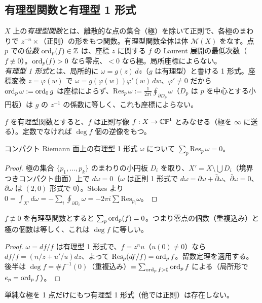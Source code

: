 \subsection{有理型関数と有理型 1 形式}
\begin{defn}
$X$ 上の\emph{有理型関数}とは、離散的な点の集合（極）を除いて正則で、各極のまわりで $z^{-n}\times$（正則）の形をもつ関数。有理型関数全体は体 $\mathcal M(X)$ をなす。点 $p$ での\emph{位数} $\operatorname{ord}_p(f)\in\mathbb Z$ は、座標 $z$ に関する $f$ の Laurent 展開の最低次数（$f\not\equiv0$）。$\operatorname{ord}_p(f)>0$ なら零点、$<0$ なら極。局所座標によらない。\\
\emph{有理型 1 形式}とは、局所的に $\omega=g(z)\,dz$（$g$ は有理型）と書ける 1 形式。座標変換 $z=\varphi(w)$ で $\omega=g(\varphi(w))\varphi'(w)\,dw$、$\varphi'\ne0$ だから $\operatorname{ord}_p\omega:=\operatorname{ord}_0g$ は座標によらず、$\mathrm{Res}_p\,\omega:=\frac1{2\pi i}\oint_{\partial D_p}\omega$（$D_p$ は $p$ を中心とする小円板）は $g$ の $z^{-1}$ の係数に等しく、これも座標によらない。
\end{defn}
$f$ を有理型関数とすると、$f$ は正則写像 $f:X\to\mathbb{CP}^1$ とみなせる（極を $\infty$ に送る）。定数でなければ $\deg f$ 個の逆像をもつ。
\begin{thm}[留数定理]\label{thm:residue}
コンパクト Riemann 面上の有理型 1 形式 $\omega$ について $\sum_{p}\mathrm{Res}_p\,\omega=0$。
\end{thm}
\begin{proof}
極の集合 $\{p_1,\dots,p_k\}$ のまわりの小円板 $D_i$ を取り、$X'=X\setminus\bigcup D_i$（境界つきコンパクト曲面）上で $d\omega=0$（$\omega$ は正則 1 形式で $d\omega=\partial\omega+\bar\partial\omega$、$\bar\partial\omega=0$、$\partial\omega$ は $(2,0)$ 形式で 0）。Stokes より $0=\int_{X'}d\omega=-\sum_i\oint_{\partial D_i}\omega=-2\pi i\sum\mathrm{Res}_{p_i}\omega$。 
\end{proof}
\begin{cor}[有理型関数の零点と極の数]\label{cor:zeropole}
$f\not\equiv0$ を有理型関数とすると $\sum_p\operatorname{ord}_p(f)=0$。つまり零点の個数（重複込み）と極の個数は等しく、これは $\deg f$ に等しい。
\end{cor}
\begin{proof}
$\omega=df/f$ は有理型 1 形式で、$f=z^nu$（$u(0)\ne0$）なら $df/f=(n/z+u'/u)dz$、よって $\operatorname{Res}_p(df/f)=\operatorname{ord}_p f$。留数定理を適用する。後半は $\deg f=\#f^{-1}(0)$（重複込み）$=\sum_{\operatorname{ord}_p f>0}\operatorname{ord}_pf$ による（局所形で $e_p=\operatorname{ord}_p f$）。
\end{proof}
\begin{cor}
単純な極を 1 点だけにもつ有理型 1 形式（他では正則）は存在しない。
\end{cor}

